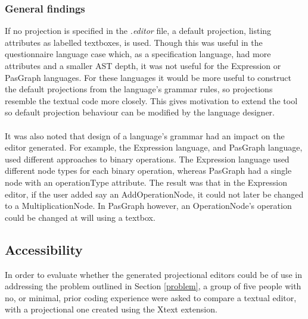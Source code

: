\documentclass{article}
\begin{document}
{%

\subsubsection{General findings}
If no projection is specified in the \emph{.editor} file, a default projection, listing attributes as labelled textboxes, is used. Though this was useful in the questionnaire language case which, as a specification language, had more attributes and a smaller AST depth, it was not useful for the Expression or PasGraph languages. For these languages it would be more useful to construct the default projections from the language's grammar rules, so projections resemble the textual code more closely. This gives motivation to extend the tool so default projection behaviour can be modified by the language designer.
\\
\\
It was also noted that design of a language's grammar had an impact on the editor generated. For example, the Expression language, and PasGraph language, used different approaches to binary operations. The Expression language used different node types for each binary operation, whereas PasGraph had a single node with an operationType attribute. The result was that in the Expression editor, if the user added say an AddOperationNode, it could not later be changed to a MultiplicationNode. In PasGraph however, an OperationNode's operation could be changed at will using a textbox.

\subsection{Accessibility}\label{Accessibility}
In order to evaluate whether the generated projectional editors could be of use in addressing the problem outlined in Section \ref{problem}, a group of five people with no, or minimal, prior coding experience were asked to compare a textual editor, with a projectional one created using the Xtext extension.

}
\end{document}
